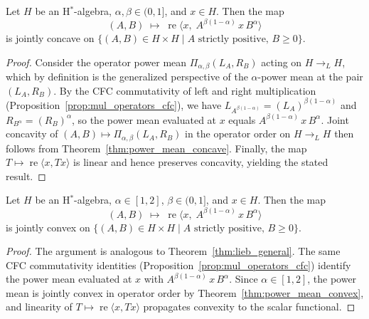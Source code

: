 \begin{theorem}
  \label{thm:lieb_general}
  \leanok
  Let $H$ be an H$^*$-algebra, $\alpha, \beta \in (0,1]$, and $x \in H$.
  Then the map
  \[
    (A, B) \;\longmapsto\; \operatorname{re}\bigl\langle x,\;
      A^{\beta(1-\alpha)}\, x\, B^{\alpha} \bigr\rangle
  \]
  is jointly concave on
  $\{(A, B) \in H \times H \mid A \text{ strictly positive},\, B \geq 0\}$.
  \begin{proof}
    \leanok
    Consider the operator power mean $\Pi_{\alpha,\beta}(L_A, R_B)$ acting on
    $H \to_L H$, which by definition is the generalized perspective of the
    $\alpha$-power mean at the pair $(L_A, R_B)$.
    By the CFC commutativity of left and right multiplication
    (Proposition~\ref{prop:mul_operators_cfc}), we have
    $L_{A^{\beta(1-\alpha)}} = (L_A)^{\beta(1-\alpha)}$ and
    $R_{B^\alpha} = (R_B)^\alpha$, so the power mean evaluated at $x$ equals
    $A^{\beta(1-\alpha)}\, x\, B^\alpha$.
    Joint concavity of $(A, B) \mapsto \Pi_{\alpha,\beta}(L_A, R_B)$ in the
    operator order on $H \to_L H$ then follows from
    Theorem~\ref{thm:power_mean_concave}.
    Finally, the map $T \mapsto \operatorname{re}\langle x, T x\rangle$ is linear
    and hence preserves concavity, yielding the stated result.
  \end{proof}
\end{theorem}

\begin{theorem}
  \label{thm:ando_general}
  \leanok
  Let $H$ be an H$^*$-algebra, $\alpha \in [1,2]$, $\beta \in (0,1]$, and $x \in H$.
  Then the map
  \[
    (A, B) \;\longmapsto\; \operatorname{re}\bigl\langle x,\;
      A^{\beta(1-\alpha)}\, x\, B^{\alpha} \bigr\rangle
  \]
  is jointly convex on
  $\{(A, B) \in H \times H \mid A \text{ strictly positive},\, B \geq 0\}$.
  \begin{proof}
    \leanok
    The argument is analogous to Theorem~\ref{thm:lieb_general}.
    The same CFC commutativity identities (Proposition~\ref{prop:mul_operators_cfc})
    identify the power mean evaluated at $x$ with
    $A^{\beta(1-\alpha)}\, x\, B^\alpha$.
    Since $\alpha \in [1,2]$, the power mean is jointly convex in operator order
    by Theorem~\ref{thm:power_mean_convex}, and linearity of
    $T \mapsto \operatorname{re}\langle x, T x\rangle$ propagates convexity
    to the scalar functional.
  \end{proof}
\end{theorem}

